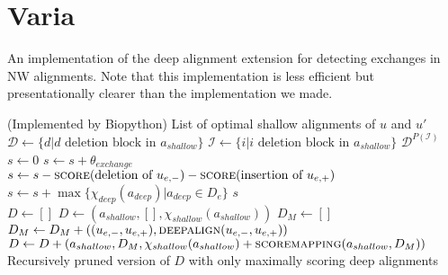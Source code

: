 \clearpage \appendix

\section{Varia}

\begin{algorithm}
\caption{An implementation of the deep alignment extension for detecting exchanges in NW alignments.
Note that this implementation is less efficient but presentationally clearer than the implementation we made.
}
\label{alg:deep-alignment}
\begin{algorithmic}
  \State (Implemented by Biopython)
  \State \Return List of optimal shallow alignments of $u$ and $u'$
\EndFunction \\

  \State $\mathcal{D}\gets \{d | d\text{ deletion block in }a_{shallow}\}$
  \State $\mathcal{I}\gets \{i | i\text{ deletion block in }a_{shallow}\}$
  \State \Return $\mathcal{D}^{P(\mathcal{I})}$ 
\EndFunction \\

  \State $s\gets 0$
    \State $s\gets s + \theta_{exchange}$
    \State $s\gets s - \Call{score}{\text{deletion of }u_{e,-}} - \Call{score}{\text{insertion of }u_{e,+}}$
    \State $s\gets s + \max\{\chi_{deep}(a_{deep}) | a_{deep} \in D_e\}$
  \EndFor
  \State \Return $s$
\EndFunction \\

  \State $D\gets []$ 
      \State $D\gets (a_{shallow}, [], \chi_{shallow}(a_{shallow}))$
    \Else
        \State $D_M\gets []$
          \State $D_M\gets D_M + ((u_{e,-}, u_{e,+}), \Call{deepalign}{u_{e,-}, u_{e,+}})$
        \EndFor
        \State $D\gets D + (a_{shallow}, D_M, \chi_{shallow}(a_{shallow}) + \Call{scoremapping}{a_{shallow}, D_M})$
      \EndFor
    \EndIf
  \EndFor
  \State \Return Recursively pruned version of $D$ with only maximally scoring deep alignments
\EndFunction
\end{algorithmic}
\end{algorithm}